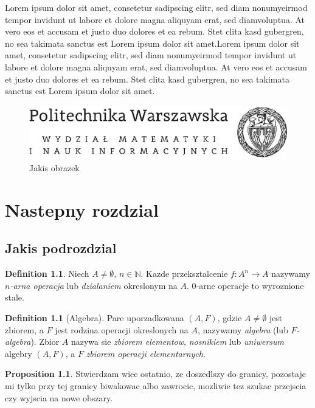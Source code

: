 \documentclass[a4paper,11pt,twoside]{report}
\theoremstyle{definition}
\newtheorem{proposition}[theorem]{Proposition}
\newtheorem{definition}[theorem]{Definition}
\begin{document}
Lorem ipsum dolor sit amet, consetetur sadipscing elitr, sed diam nonumyeirmod tempor invidunt ut labore et dolore magna aliquyam erat, sed diamvoluptua. At vero eos et accusam et justo duo dolores et ea rebum. Stet clita kasd gubergren, no sea takimata sanctus est Lorem ipsum dolor sit amet.Lorem ipsum dolor sit amet, consetetur sadipscing elitr, sed diam nonumyeirmod tempor invidunt ut labore et dolore magna aliquyam erat, sed diamvoluptua. At vero eos et accusam et justo duo dolores et ea rebum. Stet clita kasd gubergren, no sea takimata sanctus est Lorem ipsum dolor sit amet.

\begin{figure}[h!]
\centering
\includegraphics[scale=0.5]{politechnika}
\caption[Logo MiNI]{Jakis obrazek}
\end{figure}


\chapter{Nastepny rozdzial}



\section{Jakis podrozdzial}


\begin{definition}
Niech $A\neq \emptyset$, $n \in \mathbb{N}$. Kazde przeksztalcenie $f:A^n \rightarrow A$ nazywamy \textit{$n$-arna operacja} lub \textit{dzialaniem} okreslonym na $A$.
0-arne operacje to wyroznione stale.
\end{definition}


\begin{definition}[Algebra]
Pare uporzadkowana $(A,F)$, gdzie $A\neq \emptyset$ jest zbiorem, a $F$ jest rodzina operacji okreslonych na $A$, nazywamy \textit{algebra} (lub \textit{$F$-algebra}). Zbior $A$ nazywa sie \textit{zbiorem elementow}, \textit{nosnikiem} lub \textit{uniwersum} algebry $(A,F)$, a $F$ \textit{zbiorem operacji elementarnych}.
\end{definition}

\begin{proposition}
Stwierdzam wiec ostatnio, ze doszedlszy do granicy, pozostaje mi tylko przy tej granicy biwakowac albo zawrocic, mozliwie tez szukac przejscia czy wyjscia na nowe obszary.
\end{proposition}
\end{document}
